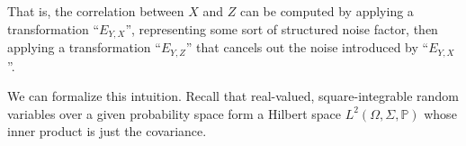 \documentclass[sigconf]{acmart}
\newcommand{\redout}[1]{{\color{red}#1}}
\def\Cor{\textnormal{Cor}}
\begin{document}
That is, the correlation between $X$ and $Z$ can be computed by applying a transformation ``$E_{Y,X}$'', representing some sort of structured noise factor, then applying a transformation ``$E_{Y,Z}$'' that cancels out the noise introduced by ``$E_{Y,X}$''. 






We can formalize this intuition. Recall that real-valued, square-integrable random variables over a given probability space form a Hilbert space $L^2(\Omega, \Sigma, \mathbb{P})$ whose inner product is just the covariance. %
\end{document}
